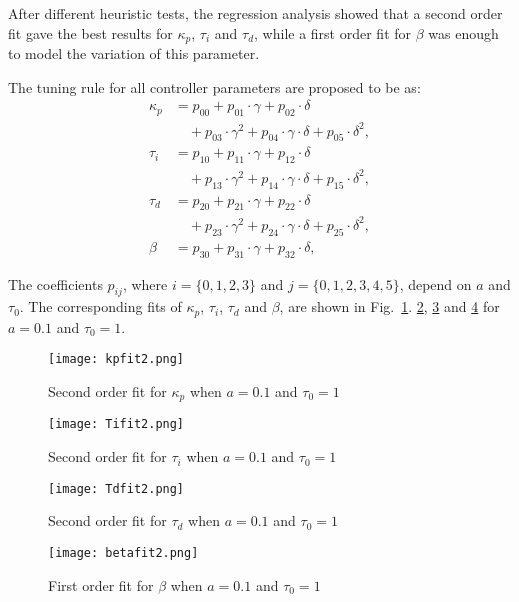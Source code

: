 After different heuristic tests, the regression analysis showed that a second order fit gave the best results for $\kappa_p$, $\tau_i$ and $\tau_d$,  while  a first order fit for $\beta$ was enough to model the variation of this parameter. 

The tuning rule for all controller parameters are proposed to be as:  
%
\begin{align}
\kappa_p &= p_{00}+p_{01}\cdot\gamma+p_{02}\cdot\delta\nonumber\\
&\quad + p_{03}\cdot\gamma^2+p_{04}\cdot\gamma\cdot \delta+p_{05}\cdot\delta^2,\label{E:eqkp}\\
%
\tau_i &= p_{10}+p_{11}\cdot\gamma+p_{12}\cdot\delta\nonumber\\
&\quad + p_{13}\cdot\gamma^2+p_{14}\cdot\gamma\cdot \delta+p_{15}\cdot\delta^2,\label{E:eqTi}\\
%
\tau_d &= p_{20}+p_{21}\cdot\gamma+p_{22}\cdot\delta\nonumber\\
&\quad+p_{23}\cdot\gamma^2+p_{24}\cdot\gamma\cdot \delta+p_{25}\cdot\delta^2,\label{E:eqTd}\\
%
\beta &=p_{30}+p_{31}\cdot\gamma+p_{32}\cdot\delta,\label{E:eqbeta}
\end{align}
%

The coefficients $p_{ij}$, where $i=\{0,1,2,3\}$ and $j=\{0,1,2,3,4,5\}$, depend on $a$ and $\tau_0$. The corresponding fits of $\kappa_p$, $\tau_i$, $\tau_d$ and $\beta$, are shown in Fig.~\ref{F:cftoolkp}. \ref{F:cftoolTi}, \ref{F:cftoolTd} and \ref{F:cftoolbeta} for $a=0.1$ and $\tau_{0}=1$.   %
%
\begin{figure}[tb]
	\centering
	\texttt{[image: kpfit2.png]}
	\caption{Second order fit for $\kappa_p$ when $a=0.1$ and $\tau_{0}=1$}
	\label{F:cftoolkp}
\end{figure}
%
\begin{figure}[tb]
	\centering
	\texttt{[image: Tifit2.png]}
	\caption{Second order fit for $\tau_i$ when $a=0.1$ and $\tau_0=1$}
	\label{F:cftoolTi}
\end{figure}
%
\begin{figure}[tb]
	\centering
	\texttt{[image: Tdfit2.png]}
	\caption{Second order fit for $\tau_d$ when $a=0.1$ and $\tau_0=1$}
	\label{F:cftoolTd}
\end{figure}
%
\begin{figure}[tb]
	\centering
	\texttt{[image: betafit2.png]}
	\caption{First order fit for $\beta$ when $a=0.1$ and $\tau_0=1$}
	\label{F:cftoolbeta}
\end{figure}


